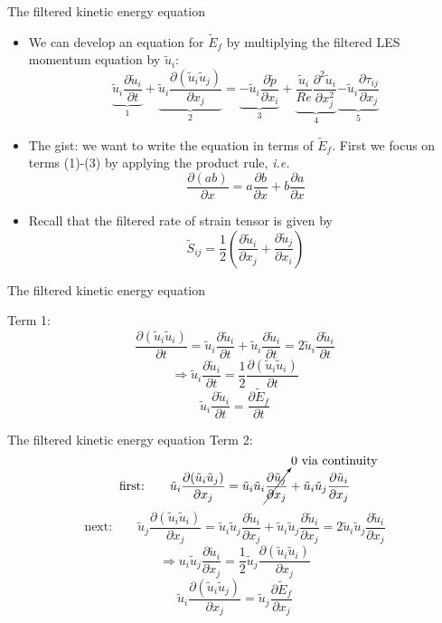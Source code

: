 
\begin{frame}{The filtered kinetic energy equation}

\begin{itemize}
\item We can develop an equation for $\tilde E_f$ by multiplying the filtered LES momentum equation by $\tilde u_i$:
$$\underbrace{\tilde u_i\frac{\partial \tilde u_i}{\partial t}}_{\text{1}} + \underbrace{\tilde u_i\frac{\partial (\tilde u_i \tilde u_j)}{\partial x_j}}_{\text{2}} = \underbrace{- \tilde u_i\frac{\partial \tilde p}{\partial x_i}}_{\text{3}} + \underbrace{\frac{\tilde u_i}{Re} \frac{\partial^2 \tilde u_i}{\partial x_j^{2}}}_{\text{4}} \underbrace{-\tilde u_i\frac{\partial \tau_{ij}}{\partial x_j}}_{\text{5}}$$
\item The gist: we want to write the equation in terms of $\tilde E_f$. First we focus on terms (1)-(3) by applying the product rule, \textit{i.e.}
$$\frac{\partial (ab)}{\partial x} = a\frac{\partial b}{\partial x} + b\frac{\partial a}{\partial x}$$
\item Recall that the filtered rate of strain tensor is given by
$$\tilde S_{ij} = \frac{1}{2} \left(\frac{\partial \tilde u_i}{\partial x_j} + \frac{\partial \tilde u_j}{\partial x_i}\right)$$
\end{itemize}
\end{frame}


\begin{frame}{The filtered kinetic energy equation}

Term 1:
$$\frac{\partial (\tilde u_i \tilde u_i)}{\partial t} = \tilde u_i \frac{\partial \tilde u_i}{\partial t} + \tilde u_i \frac{\partial \tilde u_i}{\partial t} = 2\tilde u_i \frac{\partial \tilde u_i}{\partial t}$$
$$\Rightarrow \tilde u_i \frac{\partial \tilde u_i}{\partial t} = \frac{1}{2}\frac{\partial (\tilde u_i \tilde u_i)}{\partial t}$$
$$\boxed{\tilde u_i \frac{\partial \tilde u_i}{\partial t} = \frac{\partial \tilde E_f}{\partial t}}$$
\end{frame}


\begin{frame}{The filtered kinetic energy equation}
Term 2:
$$\text{first:}\qquad \tilde u_i\frac{\partial (\tilde u_i \tilde u_j)}{\partial x_j}=\tilde u_i \tilde u_i \cancelto{0 \text{ via continuity}}{\frac{\partial \tilde u_j}{\partial x_j}} + \tilde u_i \tilde u_j \frac{\partial \tilde u_i}{\partial x_j}$$
$$\text{next:}\qquad \tilde u_j\frac{\partial (\tilde u_i \tilde u_i)}{\partial x_j} = \tilde u_i \tilde u_j\frac{\partial \tilde u_i}{\partial x_j}+ \tilde u_i \tilde u_j\frac{\partial \tilde u_i}{\partial x_j} = 2\tilde u_i \tilde u_j\frac{\partial \tilde u_i}{\partial x_j}$$
$$\Rightarrow u_i \tilde u_j\frac{\partial \tilde u_i}{\partial x_j} = \frac{1}{2}\tilde u_j\frac{\partial (\tilde u_i \tilde u_i)}{\partial x_j}$$
$$\boxed{\tilde u_i\frac{\partial (\tilde u_i \tilde u_j)}{\partial x_j} = \tilde u_j\frac{\partial \tilde E_f}{\partial x_j}}$$
\end{frame}


